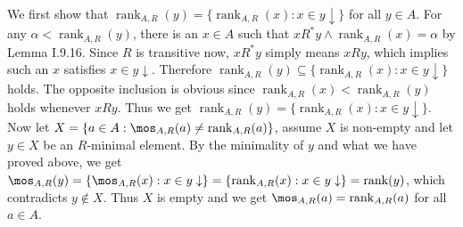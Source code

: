 \documentclass[12pt]{article}
\newcommand{\rank}{\mathop{\mathrm{rank}}}
\theoremstyle{definition}
\newenvironment{customthm}[1]
  {\renewcommand\theinnercustomthm{#1}\innercustomthm}
  {\endinnercustomthm}
\begin{document}
\begin{customthm}{I.9.41}
  We first show that $\rank_{A,R}(y)=\{\rank_{A,R}(x):x\in y\downarrow\}$ for all $y\in A$. For any $\alpha<\rank_{A,R}(y)$, there is an $x\in A$ such that $xR^*y\wedge\rank_{A,R}(x)=\alpha$ by Lemma I.9.16. Since $R$ is transitive now, $xR^*y$ simply means $xRy$, which implies such an $x$ satisfies $x\in y\downarrow$. Therefore $\rank_{A,R}(y)\subseteq\{\rank_{A,R}(x):x\in y\downarrow\}$ holds. The opposite inclusion is obvious since $\rank_{A,R}(x)<\rank_{A,R}(y)$ holds whenever $xRy$. Thus we get $\rank_{A,R}(y)=\{\rank_{A,R}(x):x\in y\downarrow\}$. Now let $X=\{a\in A:\mos_{A,R}(a)\neq\rank_{A,R}(a)\}$, assume $X$ is non-empty and let $y\in X$ be an $R$-minimal element. By the minimality of $y$ and what we have proved above, we get $\mos_{A,R}(y)=\{\mos_{A,R}(x):x\in y\downarrow\}=\{\rank_{A,R}(x):x\in y\downarrow\}=\rank(y)$, which contradicts $y\not\in X$. Thus $X$ is empty and we get $\mos_{A,R}(a)=\rank_{A,R}(a)$ for all $a\in A$.
\end{customthm}
\end{document}
